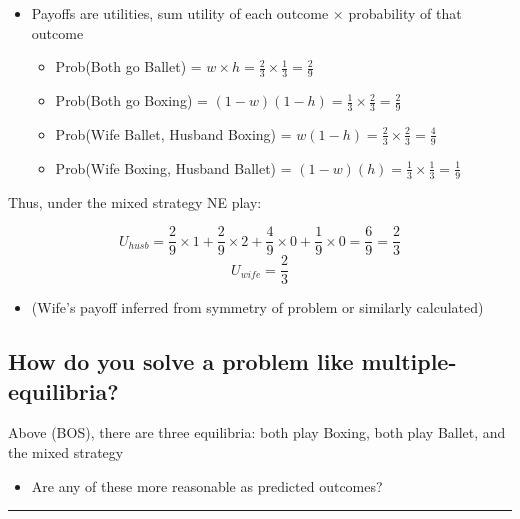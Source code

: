 \documentclass[]{article}
\providecommand{\tightlist}{%
  \setlength{\itemsep}{0pt}\setlength{\parskip}{0pt}}
\begin{document}
\begin{itemize}
\tightlist
\item
  Payoffs are utilities, sum utility of each outcome \(\times\)
  probability of that outcome

  \begin{itemize}
  \tightlist
  \item
    Prob(Both go Ballet) =
    \(w \times h = \frac{2}{3} \times \frac{1}{3} = \frac{2}{9}\)
  \item
    Prob(Both go Boxing) =
    \((1-w)(1-h) = \frac{1}{3} \times \frac{2}{3} = \frac{2}{9}\)
  \item
    Prob(Wife Ballet, Husband Boxing) =
    \(w(1-h) = \frac{2}{3} \times \frac{2}{3} = \frac{4}{9}\)
  \item
    Prob(Wife Boxing, Husband Ballet) =
    \((1-w)(h) = \frac{1}{3} \times \frac{1}{3} = \frac{1}{9}\)
  \end{itemize}
\end{itemize}

\bigskip

Thus, under the mixed strategy NE play:

\[U_{husb} =  \frac{2}{9} \times 1 +  \frac{2}{9} \times 2 +  \frac{4}{9} \times 0 + \frac{1}{9} \times 0 = \frac{6}{9} = \frac{2}{3}\]
\[U_{wife} = \frac{2}{3}\]

\begin{itemize}
\tightlist
\item
  (Wife's payoff inferred from symmetry of problem or similarly
  calculated)
\end{itemize}

\hypertarget{how-do-you-solve-a-problem-like-multiple-equilibria}{%
\subsection{How do you solve a problem like
multiple-equilibria?}\label{how-do-you-solve-a-problem-like-multiple-equilibria}}

\bigskip

Above (BOS), there are three equilibria: both play Boxing, both play
Ballet, and the mixed strategy

\begin{itemize}
\tightlist
\item
  Are any of these more reasonable as predicted outcomes?
\end{itemize}

\begin{center}\rule{0.5\linewidth}{\linethickness}\end{center}
\end{document}
